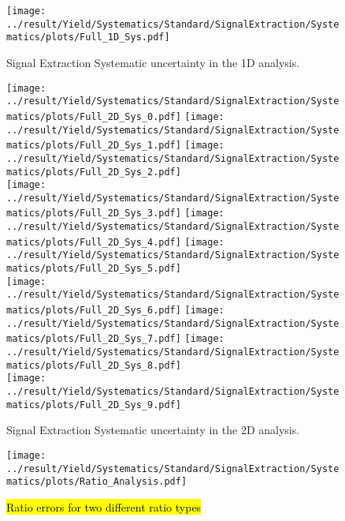 \begin{figure}
	\centering
		\texttt{[image: ../result/Yield/Systematics/Standard/SignalExtraction/Systematics/plots/Full\_1D\_Sys.pdf]}
		\caption{Signal Extraction Systematic uncertainty in the 1D analysis.}
		\label{fig:Total_SEX_1D}
\end{figure}
\begin{figure}
	\centering
		\texttt{[image: ../result/Yield/Systematics/Standard/SignalExtraction/Systematics/plots/Full\_2D\_Sys\_0.pdf]}
		\texttt{[image: ../result/Yield/Systematics/Standard/SignalExtraction/Systematics/plots/Full\_2D\_Sys\_1.pdf]}
		\texttt{[image: ../result/Yield/Systematics/Standard/SignalExtraction/Systematics/plots/Full\_2D\_Sys\_2.pdf]}\\
		\texttt{[image: ../result/Yield/Systematics/Standard/SignalExtraction/Systematics/plots/Full\_2D\_Sys\_3.pdf]}
		\texttt{[image: ../result/Yield/Systematics/Standard/SignalExtraction/Systematics/plots/Full\_2D\_Sys\_4.pdf]}
		\texttt{[image: ../result/Yield/Systematics/Standard/SignalExtraction/Systematics/plots/Full\_2D\_Sys\_5.pdf]}\\
		\texttt{[image: ../result/Yield/Systematics/Standard/SignalExtraction/Systematics/plots/Full\_2D\_Sys\_6.pdf]}
		\texttt{[image: ../result/Yield/Systematics/Standard/SignalExtraction/Systematics/plots/Full\_2D\_Sys\_7.pdf]}
		\texttt{[image: ../result/Yield/Systematics/Standard/SignalExtraction/Systematics/plots/Full\_2D\_Sys\_8.pdf]}\\
		\texttt{[image: ../result/Yield/Systematics/Standard/SignalExtraction/Systematics/plots/Full\_2D\_Sys\_9.pdf]}
		\caption{Signal Extraction Systematic uncertainty in the 2D analysis.}
		\label{fig:Total_SEX_2D}
\end{figure}

\begin{figure}
	\centering
		\texttt{[image: ../result/Yield/Systematics/Standard/SignalExtraction/Systematics/plots/Ratio\_Analysis.pdf]}
		\caption{\hl{Ratio errors for two different ratio types}}
		\label{}
\end{figure}

\newpage
